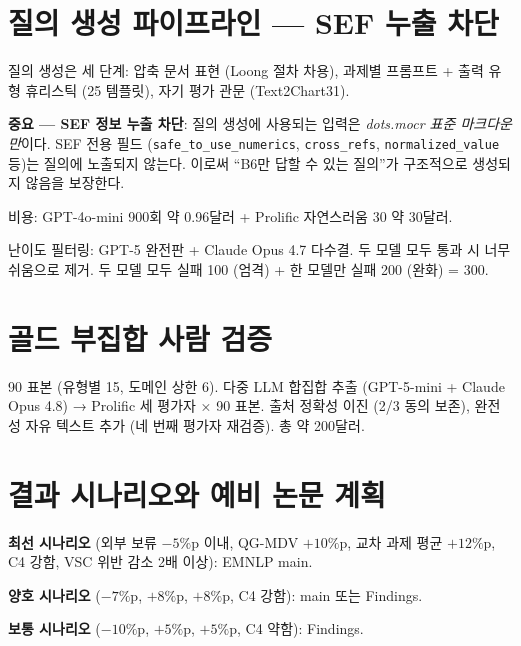 \documentclass[11pt]{article}
\begin{document}
\section{질의 생성 파이프라인 — SEF 누출 차단}
\label{sec:querygen}

질의 생성은 세 단계: 압축 문서 표현 (Loong 절차 차용), 과제별 프롬프트 + 출력 유형 휴리스틱 (25 템플릿), 자기 평가 관문 (Text2Chart31).

\textbf{중요 — SEF 정보 누출 차단}: 질의 생성에 사용되는 입력은 \emph{dots.mocr 표준 마크다운만}이다. SEF 전용 필드 (\texttt{safe\_to\_use\_numerics}, \texttt{cross\_refs}, \texttt{normalized\_value} 등)는 질의에 노출되지 않는다. 이로써 ``B6만 답할 수 있는 질의''가 구조적으로 생성되지 않음을 보장한다.

비용: GPT-4o-mini 900회 약 0.96달러 + Prolific 자연스러움 30 약 30달러.

난이도 필터링: GPT-5 완전판 + Claude Opus 4.7 다수결. 두 모델 모두 통과 시 너무 쉬움으로 제거. 두 모델 모두 실패 100 (엄격) + 한 모델만 실패 200 (완화) = 300.

\section{골드 부집합 사람 검증}

90 표본 (유형별 15, 도메인 상한 6). 다중 LLM 합집합 추출 (GPT-5-mini + Claude Opus 4.8) → Prolific 세 평가자 × 90 표본. 출처 정확성 이진 (2/3 동의 보존), 완전성 자유 텍스트 추가 (네 번째 평가자 재검증). 총 약 200달러.

\section{결과 시나리오와 예비 논문 계획}
\label{sec:scenarios}

\textbf{최선 시나리오} (외부 보류 $-5\%$p 이내, QG-MDV $+10\%$p, 교차 과제 평균 $+12\%$p, C4 강함, VSC 위반 감소 2배 이상): EMNLP main.

\textbf{양호 시나리오} ($-7\%$p, $+8\%$p, $+8\%$p, C4 강함): main 또는 Findings.

\textbf{보통 시나리오} ($-10\%$p, $+5\%$p, $+5\%$p, C4 약함): Findings.
\end{document}
